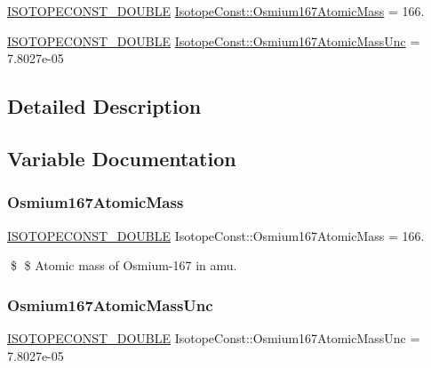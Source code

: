\begin{DoxyCompactItemize}
\item 
\mbox{\hyperlink{group___isotope_const-_macros_ga8f45a7272ce02c0b4c65c44636ed719a}{I\+S\+O\+T\+O\+P\+E\+C\+O\+N\+S\+T\+\_\+\+D\+O\+U\+B\+LE}} \mbox{\hyperlink{group___isotope_const-_osmium-_os167_ga7081d7ea38efd5102cb098fd631a99c5}{Isotope\+Const\+::\+Osmium167\+Atomic\+Mass}} = 166.
\item 
\mbox{\hyperlink{group___isotope_const-_macros_ga8f45a7272ce02c0b4c65c44636ed719a}{I\+S\+O\+T\+O\+P\+E\+C\+O\+N\+S\+T\+\_\+\+D\+O\+U\+B\+LE}} \mbox{\hyperlink{group___isotope_const-_osmium-_os167_ga00fd89b6017dcd6d71cfe58b39cc1be8}{Isotope\+Const\+::\+Osmium167\+Atomic\+Mass\+Unc}} = 7.\+8027e-\/05
\end{DoxyCompactItemize}


\subsection{Detailed Description}


\subsection{Variable Documentation}
\mbox{\label{group___isotope_const-_osmium-_os167_ga7081d7ea38efd5102cb098fd631a99c5}} 
\subsubsection{\texorpdfstring{Osmium167\+Atomic\+Mass}{Osmium167AtomicMass}}
{\footnotesize\ttfamily \mbox{\hyperlink{group___isotope_const-_macros_ga8f45a7272ce02c0b4c65c44636ed719a}{I\+S\+O\+T\+O\+P\+E\+C\+O\+N\+S\+T\+\_\+\+D\+O\+U\+B\+LE}} Isotope\+Const\+::\+Osmium167\+Atomic\+Mass = 166.}

\$ \$ Atomic mass of Osmium-\/167 in amu. \mbox{\label{group___isotope_const-_osmium-_os167_ga00fd89b6017dcd6d71cfe58b39cc1be8}} 
\subsubsection{\texorpdfstring{Osmium167\+Atomic\+Mass\+Unc}{Osmium167AtomicMassUnc}}
{\footnotesize\ttfamily \mbox{\hyperlink{group___isotope_const-_macros_ga8f45a7272ce02c0b4c65c44636ed719a}{I\+S\+O\+T\+O\+P\+E\+C\+O\+N\+S\+T\+\_\+\+D\+O\+U\+B\+LE}} Isotope\+Const\+::\+Osmium167\+Atomic\+Mass\+Unc = 7.\+8027e-\/05}

